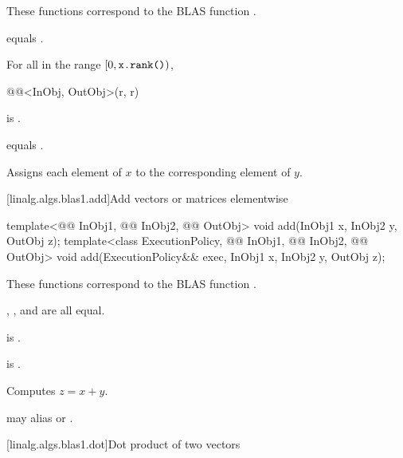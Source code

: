 \begin{itemdescr}
\pnum
\begin{note}
These functions correspond to the BLAS function .
\end{note}

\pnum
\constraints
{} equals .

\pnum
\mandates
For all  in the range $[ 0, \tcode{x.rank()})$,
\begin{codeblock}
@@<InObj, OutObj>(r, r)
\end{codeblock}
is .

\pnum
\expects
{} equals .

\pnum
\effects
Assigns each element of $x$ to the corresponding element of $y$.
\end{itemdescr}

[linalg.algs.blas1.add]{Add vectors or matrices elementwise}

%
\begin{itemdecl}
template<@@ InObj1, @@ InObj2, @@ OutObj>
  void add(InObj1 x, InObj2 y, OutObj z);
template<class ExecutionPolicy, @@ InObj1, @@ InObj2, @@ OutObj>
  void add(ExecutionPolicy&& exec,
           InObj1 x, InObj2 y, OutObj z);
\end{itemdecl}

\begin{itemdescr}
\pnum
\begin{note}
These functions correspond to the BLAS function \supercite{blas1}.
\end{note}

\pnum
\constraints
{}, , and  are all equal.

\pnum
\mandates
{} is .

\pnum
\expects
{} is .

\pnum
\effects
Computes $z = x + y$.

\pnum
\remarks
{} may alias  or .
\end{itemdescr}

[linalg.algs.blas1.dot]{Dot product of two vectors}

